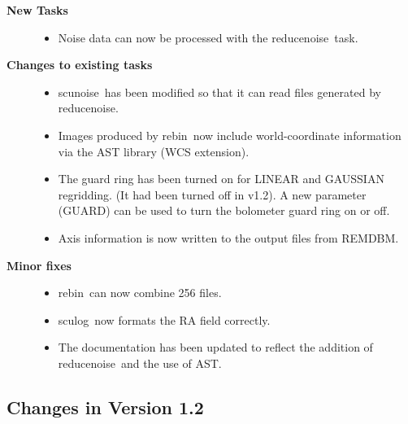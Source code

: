 \documentclass[twoside,11pt]{article}
\newcommand{\task}[1]{{\sf #1}}
\newcommand{\renoise}{\htmlref{\task{reduce\_noise}}{REDUCE_NOISE}}
\newcommand{\rebin}{\htmlref{\task{rebin}}{REBIN}}
\newcommand{\sculog}{\htmlref{\task{sculog}}{SCULOG}}
\newcommand{\scunoise}{\htmlref{\task{scunoise}}{SCUNOISE}}
\newcommand{\htmlref}[2]{#1}
\renewcommand{\_}{\texttt{\symbol{95}}}
\begin{document}
\begin{description}

\item[\textbf{New Tasks}] \mbox{}

\begin{itemize}
\item Noise data can now be processed with the \renoise\ task. 
\end{itemize}

\item[\textbf{Changes to existing tasks}] \mbox{}
\begin{itemize}
\item \scunoise\ has been modified so that it can read files generated by
\renoise.
\item Images produced by \rebin\ now include world-coordinate information via
the AST library (WCS extension).
\item The guard ring has been turned on for LINEAR and GAUSSIAN regridding.
    (It had been turned off in v1.2). A new parameter (GUARD) can be used
    to turn the bolometer guard ring on or off.
\item Axis information is now written to the output files from REMDBM.

\end{itemize}

\item[\textbf{Minor fixes}] \mbox{}
\begin{itemize}
\item \rebin\ can now combine 256 files.
\item \sculog\ now formats the RA field correctly.
\item The documentation has been updated to reflect the addition of \renoise\
and the use of AST.
\end{itemize}

\end{description}

\subsection{Changes in Version 1.2}
\end{document}
